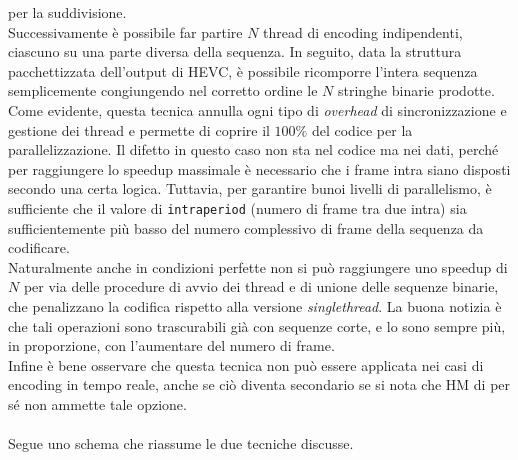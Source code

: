 per la suddivisione.\\
Successivamente è possibile far partire $N$ thread di encoding 
indipendenti, ciascuno su una parte diversa della sequenza. In seguito, data la 
struttura 
pacchettizzata dell'output di HEVC, è possibile ricomporre l'intera 
sequenza semplicemente congiungendo nel corretto ordine le $N$ stringhe binarie 
prodotte. \\
Come evidente, questa tecnica annulla ogni tipo di \emph{overhead} di 
sincronizzazione e gestione dei thread e permette di coprire il $100\%$ del 
codice per la parallelizzazione. Il difetto in questo caso non sta nel codice 
ma nei dati, perché per raggiungere lo speedup massimale è necessario che i 
frame intra siano disposti secondo una certa logica. Tuttavia, per garantire 
bunoi livelli di parallelismo, è sufficiente che il valore di 
\verb|intraperiod| (numero di frame tra due intra) sia sufficientemente più 
basso del numero complessivo di frame della sequenza da codificare. \\
Naturalmente anche in condizioni perfette non si può raggiungere uno speedup di 
$N$ per via delle procedure di avvio dei thread e di
unione delle sequenze binarie, che penalizzano la codifica 
rispetto alla versione \emph{singlethread}. La buona 
notizia è che tali operazioni sono trascurabili già con sequenze corte, e lo 
sono sempre più, in proporzione, con l'aumentare del numero di frame.\\
Infine è bene osservare che questa tecnica non può essere applicata 
nei casi di encoding in tempo reale, anche se ciò diventa secondario se si nota 
che HM di per sé non ammette tale opzione.
\\ \\
Segue uno schema che riassume le due tecniche discusse.

